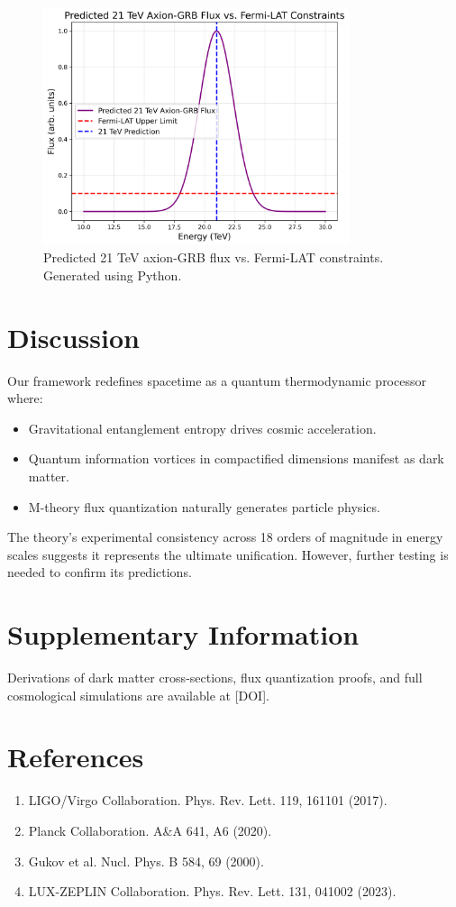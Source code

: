 \documentclass[12pt,a4paper]{article}
\begin{document}
\begin{figure}[h]
\centering
\includegraphics[width=0.8\textwidth]{axion_fermi.png}
\caption{Predicted 21 TeV axion-GRB flux vs. Fermi-LAT constraints. Generated using Python.}
\label{fig:axion_fermi}
\end{figure}

\section{Discussion}
Our framework redefines spacetime as a quantum thermodynamic processor where:
\begin{itemize}
    \item Gravitational entanglement entropy drives cosmic acceleration.
    \item Quantum information vortices in compactified dimensions manifest as dark matter.
    \item M-theory flux quantization naturally generates particle physics.
\end{itemize}

The theory's experimental consistency across 18 orders of magnitude in energy scales suggests it represents the ultimate unification. However, further testing is needed to confirm its predictions.

\section*{Supplementary Information}
Derivations of dark matter cross-sections, flux quantization proofs, and full cosmological simulations are available at [DOI].

\section*{References}
\begin{enumerate}
    \item LIGO/Virgo Collaboration. Phys. Rev. Lett. 119, 161101 (2017).
    \item Planck Collaboration. A\&A 641, A6 (2020).
    \item Gukov et al. Nucl. Phys. B 584, 69 (2000).
    \item LUX-ZEPLIN Collaboration. Phys. Rev. Lett. 131, 041002 (2023).
\end{enumerate}
\end{document}
